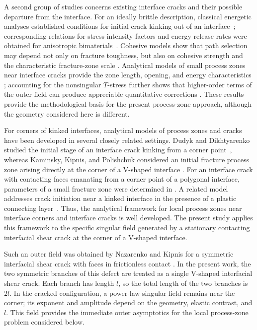 \documentclass[pdflatex,onecolumn,sn-mathphys-ay]{sn-jnl}
\begin{document}
A second group of studies concerns existing interface cracks and their
possible departure from the interface. For an ideally brittle description,
classical energetic analyses established conditions for initial crack kinking
out of an interface~\citep{HeHutchinson1989}; corresponding relations for
stress intensity factors and energy release rates were obtained for
anisotropic bimaterials~\citep{Wang1994}. Cohesive models show that path
selection may depend not only on fracture toughness, but also on cohesive
strength and the characteristic fracture-zone scale
\citep{ParmigianiThouless2006}. Analytical models of small process zones near
interface cracks provide the zone length, opening, and energy characteristics
\citep{KaminskyEtAl2023}; accounting for the
nonsingular $T$-stress further shows that higher-order terms of the outer
field can produce appreciable quantitative corrections
\citep{KaminskyDudykChornoivan2026}. These results provide the methodological basis for the present process-zone
approach, although the geometry considered here is different.

For corners of kinked interfaces, analytical models of process zones and
cracks have been developed in several closely related settings.
Dudyk and Dikhtyarenko studied the initial stage of an interface crack
kinking from a corner point~\citeyearpar{DudykDikhtyarenko2012}, whereas Kaminsky,
Kipnis, and Polishchuk considered an initial fracture process zone arising
directly at the corner of a V-shaped interface
\citeyearpar{KaminskyKipnisPolishchuk2012}. For an interface crack with contacting
faces emanating from a corner point of a polygonal interface, parameters of a
small fracture zone were determined in
\citep{KaminskyDudykFenkiv2023}. A related model addresses crack initiation near a kinked interface in the
presence of a plastic connecting layer~\citep{KaminskyDudykPolishchuk2024}. Thus, the analytical framework for local process zones near interface
corners and interface cracks is well developed. The present study applies
this framework to the specific singular field generated by a stationary
contacting interfacial shear crack at the corner of a V-shaped interface.

Such an outer field was obtained by Nazarenko and Kipnis for a symmetric
interfacial shear crack with faces in frictionless contact
\citep{NazarenkoKipnis2022Stress}. In the present work, the two symmetric
branches of this defect are treated as a single V-shaped interfacial shear
crack. Each branch has length $l$, so the total length of the two branches is
$2l$. In the cracked configuration, a power-law singular field remains near
the corner; its exponent and amplitude depend on the geometry, elastic
contrast, and $l$. This field provides the immediate outer asymptotics for
the local process-zone problem considered below.
\end{document}
